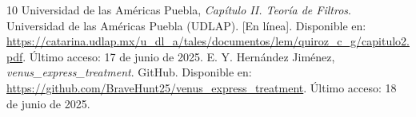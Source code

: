 \documentclass[letterpaper,11pt]{article}
\begin{document}
\begin{thebibliography}{10}
        Universidad de las Américas Puebla, \textit{Capítulo II. Teoría de Filtros}. Universidad de las Américas Puebla (UDLAP). [En línea]. Disponible en: \url{https://catarina.udlap.mx/u_dl_a/tales/documentos/lem/quiroz_c_g/capitulo2.pdf}. Último acceso: 17 de junio de 2025.
 E. Y. Hernández Jiménez, \textit{venus\_express\_treatment}. GitHub. Disponible en: \url{https://github.com/BraveHunt25/venus_express_treatment}. Último acceso: 18 de junio de 2025.
    \end{thebibliography}
\end{document}
